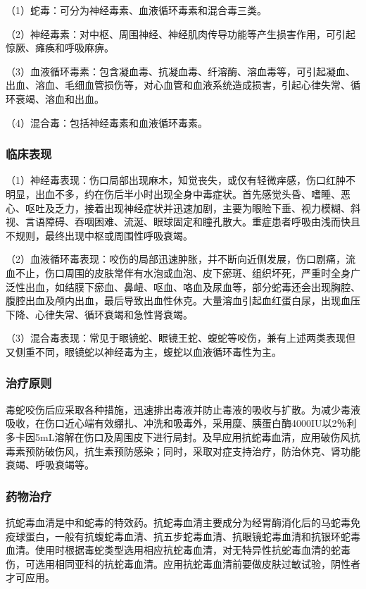 （1）蛇毒：可分为神经毒素、血液循环毒素和混合毒三类。

（2）神经毒素：对中枢、周围神经、神经肌肉传导功能等产生损害作用，可引起惊厥、瘫痪和呼吸麻痹。

（3）血液循环毒素：包含凝血毒、抗凝血毒、纤溶酶、溶血毒等，可引起凝血、出血、溶血、毛细血管损伤等，对心血管和血液系统造成损害，引起心律失常、循环衰竭、溶血和出血。

（4）混合毒：包括神经毒素和血液循环毒素。

\subsubsection{临床表现}

（1）神经毒表现：伤口局部出现麻木，知觉丧失，或仅有轻微痒感，伤口红肿不明显，出血不多，约在伤后半小时出现全身中毒症状。首先感觉头昏、嗜睡、恶心、呕吐及乏力，接着出现神经症状并迅速加剧，主要为眼睑下垂、视力模糊、斜视、言语障碍、吞咽困难、流涎、眼球固定和瞳孔散大。重症患者呼吸由浅而快且不规则，最终出现中枢或周围性呼吸衰竭。

（2）血液循环毒表现：咬伤的局部迅速肿胀，并不断向近侧发展，伤口剧痛，流血不止，伤口周围的皮肤常伴有水泡或血泡、皮下瘀斑、组织坏死，严重时全身广泛性出血，如结膜下瘀血、鼻衄、呕血、咯血及尿血等，部分蛇毒还会出现胸腔、腹腔出血及颅内出血，最后导致出血性休克。大量溶血引起血红蛋白尿，出现血压下降、心律失常、循环衰竭和急性肾衰竭。

（3）混合毒表现：常见于眼镜蛇、眼镜王蛇、蝮蛇等咬伤，兼有上述两类表现但又侧重不同，眼镜蛇以神经毒为主，蝮蛇以血液循环毒性为主。

\subsubsection{治疗原则}

毒蛇咬伤后应采取各种措施，迅速排出毒液并防止毒液的吸收与扩散。为减少毒液吸收，在伤口近心端有效绷扎、冲洗和吸毒外，采用糜、胰蛋白酶4000IU以2％利多卡因5mL溶解在伤口及周围皮下进行局封。及早应用抗蛇毒血清，应用破伤风抗毒素预防破伤风，抗生素预防感染；同时，采取对症支持治疗，防治休克、肾功能衰竭、呼吸衰竭等。

\subsubsection{药物治疗}

抗蛇毒血清是中和蛇毒的特效药。抗蛇毒血清主要成分为经胃酶消化后的马蛇毒免疫球蛋白，一般有抗蝮蛇毒血清、抗五步蛇毒血清、抗眼镜蛇毒血清和抗银环蛇毒血清。使用时根据毒蛇类型选用相应抗蛇毒血清，对无特异性抗蛇毒血清的蛇毒伤，可选用相同亚科的抗蛇毒血清。应用抗蛇毒血清前要做皮肤过敏试验，阴性者才可应用。

